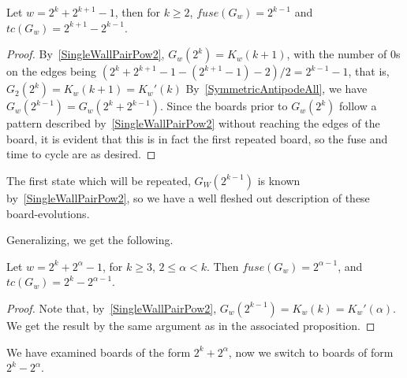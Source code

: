 \documentclass[12pt,letterpaper]{article}
\begin{document}
\begin{prop}\label{BetweenPows2}
  Let $w=2^k+2^{k+1}-1$, then for $k\geq 2$, $fuse(G_w)=2^{k-1}$ and $tc(G_w)=2^{k+1}-2^{k-1}$.
\end{prop}
\begin{proof}
  By~\cref{SingleWallPairPow2}, %
  $G_w(2^k)=K_w(k+1)$, with the number of 0s on the edges being $(2^k+2^{k+1}-1-(2^{k+1}-1)-2)/2=2^{k-1}-1$, that is, $G_2(2^k)=K_w(k+1)=K_w'(k)$ By~\cref{SymmetricAntipodeAll}, we have $G_w(2^{k-1})=G_w(2^k+2^{k-1})$. Since the boards prior to $G_w(2^k)$ follow a pattern described by~\cref{SingleWallPairPow2} without reaching the edges of the board, it is evident that this is in fact the first repeated board, so the fuse and time to cycle are as desired. 
\end{proof}
\begin{remark}
  The first state which will be repeated, $G_W(2^{k-1})$ is known by~\cref{SingleWallPairPow2}, so we have a well fleshed out description of these board-evolutions.
\end{remark}
Generalizing, we get the following.
\begin{cor}\label{Pow2PlusPow2}
  Let $w=2^k+2^\alpha-1$, for $k\geq 3$, $2\leq \alpha<k$. Then $fuse(G_w)=2^{\alpha-1}$, and $tc(G_w)=2^k-2^{\alpha-1}$.
\end{cor}
\begin{proof}
  Note that, by~\cref{SingleWallPairPow2}, $G_w(2^{k-1})=K_w(k)=K_w'(\alpha)$. We get the result by the same argument as in the associated proposition.
\end{proof}

We have examined boards of the form $2^k+2^\alpha$, now we switch to boards of form $2^k-2^\alpha$. 
\end{document}
